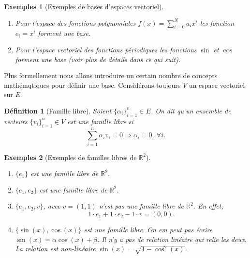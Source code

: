 \documentclass[a4paper,12pt]{book}
\newcommand{\real}{\mathbb{R}}
\newtheorem{definition}{Définition}
\newtheorem*{exemples}{Exemples}
\begin{document}
\begin{exemples}[Exemples de bases d'espaces vectoriel]\hfill\break
 \begin{enumerate}
  \item Pour l'espace des fonctions polynomiales $f(x)=\sum_{i=0}^Na_ix^i$ les 
  fonction $e_i=x^i$ forment une base.
  \item Pour l'espace vectoriel des fonctions périodiques les fonctions $\sin$ et $\cos$ forment une base
  (voir plus de détails dans ce qui suit).
 \end{enumerate}

\end{exemples}

Plus formellement nous allons introduire un certain nombre de concepts mathémqtiques pour
définir une base. Considérons toujours $V$ un espace vectoriel sur $E$.

\begin{definition}[Famille libre]
 Soient $\{\alpha_i\}_{i=1}^n\in E$. On dit qu'un ensemble de vecteurs $\{v_i\}_{i=1}^n\in V$ est une famille libre si 
 \begin{equation}
  \sum_{i=1}^n \alpha_iv_i=0 \Rightarrow \alpha_i=0,\ \forall i.
 \end{equation}
\end{definition}
\begin{exemples}[Exemples de familles libres de $\real^2$]\hfill\break
\begin{enumerate}
 \item $\{e_1\}$ est une famille libre de $\real^2$.
 \item $\{e_1,e_2\}$ est une famille libre de $\real^2$.
 \item $\{e_1,e_2,v\}$, avec $v=(1,1)$ n'est pas une famille libre de $\real^2$. En effet,
 \begin{equation}
  1\cdot e_1+1\cdot e_2-1\cdot v=(0,0).
 \end{equation}
 \item $\{\sin(x),\cos(x)\}$ est une famille libre. On em peut pas écrire $\sin(x)=\alpha\cos(x)+\beta$. Il n'y a pas de relation
 linéaire qui relie les deux. La relation est non-linéaire $\sin(x)=\sqrt{1-\cos^2(x)}$.
\end{enumerate}
\end{exemples}
\end{document}

